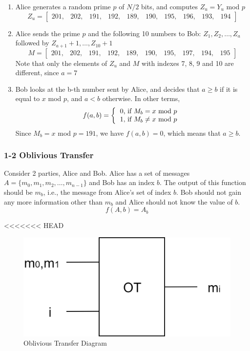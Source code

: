 \begin{refsection}
\begin{enumerate}
\item Alice generates a random prime $p$ of $N/2$ bits, and computes $Z_u = Y_u$  mod  $p$
\[
Z_u = \begin{bmatrix}
        201,&202,&191,&192,&189,&190,&195,&196,&193,&194
      \end{bmatrix}
\]

\item Alice sends the prime $p$ and the following 10 numbers to Bob: $Z_1,Z_2,\ldots,Z_a$
followed by $Z_{a+1}+1,\ldots,Z_{10}+1$
\[
M = \begin{bmatrix}
        201,&202,&191,&192,&189,&190,&195,&197,&194,&195
      \end{bmatrix}
\]
Note that only the elements of $Z_u$ and $M$ with indexes 7, 8, 9 and 10 are different, since $a = 7$

\item Bob looks at the b-th number sent by Alice, and decides that $a \geq b$ if it is equal to $x$ mod $p$,
and $a < b$ otherwise. In other terms,
\[
f(a,b) = \left \{
          \begin{tabular}{ccc}
          0, if $M_b = x$ mod $p$ \\
          1, if $M_b \ne x$ mod $p$
          \end{tabular}
        \right.
\]
Since $M_b = x$ mod $p = 191$, we have $f(a,b) = 0$, which means that $a \geq b$.
\end{enumerate}

\subsubsection{1-2 Oblivious Transfer}
Consider 2 parties, Alice and Bob. Alice has a set of messages $A=\{m_0,m_1,m_2,\ldots,m_{n-1}\}$
and Bob has an index $b$. The output of this function should be $m_b$, i.e., the message from Alice's set of index $b$. Bob should not gain any more information other than $m_b$ and Alice should not know the value of $b$.
\begin{equation}\label{eq:messageaccess}
f(A,b) = A_b
\end{equation}

<<<<<<< HEAD
\renewcommand{\figurename}{Figure}
\begin{figure}[H]
\centering
\includegraphics[width=.4\linewidth]{./sdf/classical_mpc/figures/OT}
\caption{Oblivious Transfer Diagram}
\label{fig:otscheme}
\end{figure}


\end{refsection}
